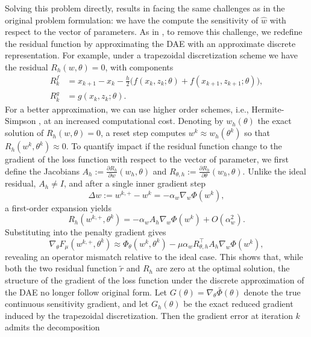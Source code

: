Solving this problem directly, results in facing the same challenges as in the original problem formulation: we have the compute the sensitivity of $\hat{w}$ with respect to the vector of parameters. As in \cite{JMLR:v24:22-1002}, to remove this challenge, we redefine the residual function by approximating the DAE with an approximate discrete representation. For example, under a trapezoidal discretization scheme we have the residual $R_h(w,\theta)=0$, with components
\begin{align}
R^f_k &=
x_{k+1}-x_k-\frac{h}{2}\big(f(x_k,z_k;\theta)+f(x_{k+1},z_{k+1};\theta)\big), \\
R^g_k &= g(x_k,z_k;\theta).
\end{align}
For a better approximation, we can use higher order schemes, i.e.,  Hermite-Simpson \cite{MorenoMartin2024Collocation}, at an increased computational cost. Denoting by $w_h(\theta)$ the exact solution of $R_h(w,\theta)=0$, a reset step computes $w^k \approx w_h(\theta^k)$ so that
$R_h(w^k,\theta^k)\approx 0$. To quantify impact if the residual function change to the gradient of the loss function with respect to the vector of parameter, we first define the Jacobians $A_h := \frac{\partial R_h}{\partial w}(w_h,\theta)$ and $R_{\theta,h} := \frac{\partial R_h}{\partial \theta}(w_h,\theta)$. Unlike the ideal residual, $A_h \neq I$, and  after a single inner gradient step
\begin{equation}
\Delta w := w^{k,+}-w^k = -\alpha_w \nabla_w \Phi(w^k),
\end{equation}
a first-order expansion yields
\begin{equation}
R_h(w^{k,+},\theta^k)
=
-\alpha_w A_h \nabla_w \Phi(w^k) + O(\alpha_w^2).
\end{equation}
Substituting into the penalty gradient gives
\begin{equation}
\nabla_\theta F_\mu(w^{k,+},\theta^k)
\approx
\Phi_\theta(w^k,\theta^k)
-
\mu \alpha_w R_{\theta,h}^\top A_h \nabla_w \Phi(w^k),
\end{equation}
revealing an operator mismatch relative to the ideal case. This shows that, while both the two residual function $\tilde{r}$ and $R_h$ are zero at the optimal solution, the structure of the gradient of the loss function under the discrete approximation of the DAE no longer follow original form. 
Let $G(\theta)=\nabla_\theta \bar\Phi(\theta)$ denote the true continuous sensitivity gradient, and let $G_h(\theta)$ be the exact reduced gradient induced by the trapezoidal discretization.
Then the gradient error at iteration $k$ admits the decomposition
